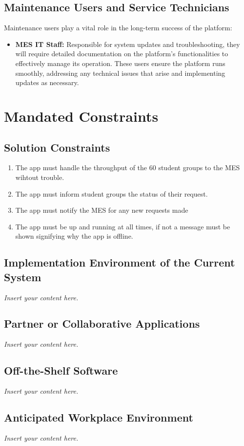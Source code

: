 \documentclass[12pt]{article}
\newcommand{\lips}{\textit{Insert your content here.}}
\begin{document}
\subsection{Maintenance Users and Service Technicians}
Maintenance users play a vital role in the long-term success of the platform:
\begin{itemize}
    \item \textbf{MES IT Staff:} Responsible for system updates and troubleshooting, they will require detailed documentation on the platform's functionalities to effectively manage its operation. These users ensure the platform runs smoothly, addressing any technical issues that arise and implementing updates as necessary.
\end{itemize}




\section{Mandated Constraints}
\subsection{Solution Constraints}
\begin{enumerate}
  \item The app must handle the throughput of the 60 student groups to the MES wihtout trouble.
  \item The app must inform student groups the status of their request. 
  \item The app must notify the MES for any new requests made 
  \item The app must be up and running at all times, if not a message must be shown signifying why the app is offline. 
\end{enumerate}
\subsection{Implementation Environment of the Current System}
\lips
\subsection{Partner or Collaborative Applications}
\lips
\subsection{Off-the-Shelf Software}
\lips
\subsection{Anticipated Workplace Environment}
\lips
\end{document}
